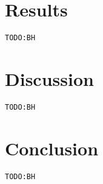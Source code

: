 \documentclass{llncs}
\newcommand{\todo}[1]{\texttt{\color{red}TODO:#1}}
\begin{document}
\section{Results}
\todo{BH}

\section{Discussion}
\todo{BH}

\section{Conclusion}
\label{sec:Conclusion}
\todo{BH}




\end{document}
